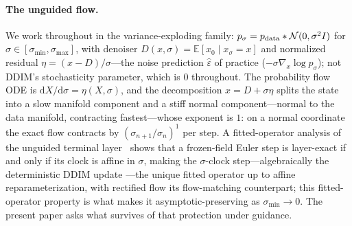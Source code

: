 \documentclass{article} %
\newcommand{\E}{\mathbb{E}}
\theoremstyle{plain}
\theoremstyle{definition}
\theoremstyle{remark}
\providecommand{\dd}{\mathrm{d}}
\providecommand{\smin}{\sigma_{\min}}
\providecommand{\smax}{\sigma_{\max}}
\begin{document}
\paragraph{The unguided flow.}
We work throughout in the variance-exploding family: $p_\sigma = p_{\rm
data} * \mathcal N(0,\sigma^2 I)$ for $\sigma \in [\smin,\smax]$, with
denoiser $D(x,\sigma) = \E[x_0 \mid x_\sigma = x]$ and normalized residual
$\eta = (x - D)/\sigma$---the noise prediction $\hat\varepsilon$ of practice
($-\sigma\nabla_x \log p_\sigma$); not DDIM's stochasticity parameter, which
is $0$ throughout. The probability flow ODE is $\dd X/\dd\sigma =
\eta(X,\sigma)$, and the decomposition $x = D + \sigma\eta$ splits the state
into a slow manifold component and a stiff normal component---normal to the
data manifold, contracting fastest---whose exponent
is $1$: on a normal coordinate the exact flow contracts by
$(\sigma_{n+1}/\sigma_n)^1$ per step. A fitted-operator analysis of the
unguided terminal layer~\citep{ap2026} shows
that a frozen-field Euler step is layer-exact if and
only if its clock is affine in $\sigma$, making the $\sigma$-clock
step---algebraically the deterministic DDIM update \citep{song2021ddim}---the
unique fitted operator
up to affine reparameterization, with rectified flow its flow-matching
counterpart; this fitted-operator property is what makes it
asymptotic-preserving as $\smin \to 0$. The present paper asks what
survives of that protection under guidance.
\end{document}
